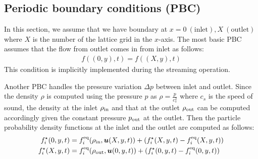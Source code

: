 \subsection{Periodic boundary conditions (PBC)}
In this section, we assume that we have
boundary at $x = 0~(\text{inlet}), X~(\text{outlet})$
where $X$ is the number of the lattice grid in the $x$-axis.
The most basic PBC assumes that
the flow from outlet comes in from inlet as follows: 
\begin{equation}
\begin{aligned}
  f((0, y), t) = f((X, y), t)
\end{aligned}
\end{equation}
This condition is implicitly implemented during the streaming operation.

Another PBC handles
the pressure variation $\Delta p$ between inlet and outlet.
Since the density $\rho$ is computed using the pressure $p$
as $\rho = \frac{p}{c_s^2}$ where $c_s$ is the speed of sound,
the density at the inlet $\rho_{\rm in}$ and
that at the outlet $\rho_{\rm out}$ can be computed
accordingly given the constant pressure $p_{\rm out}$
at the outlet.
Then the particle probability density functions at 
the inlet and the outlet are computed as follows\cite{}:
\begin{equation}
\begin{aligned}
  f_i^\star(0, y, t) &=
  f_i^{\rm eq}(\rho_{\rm in}, \boldsymbol{u}(X, y, t))
  + (f_i^\star(X, y, t) - f_i^{\rm eq}(X, y, t))\\
  f_i^\star(X, y, t) &=
  f_i^{\rm eq}(\rho_{\rm out}, \boldsymbol{u}(0, y, t))
  + (f_i^\star(0, y, t) - f_i^{\rm eq}(0, y, t))\\
\end{aligned}
\end{equation}

